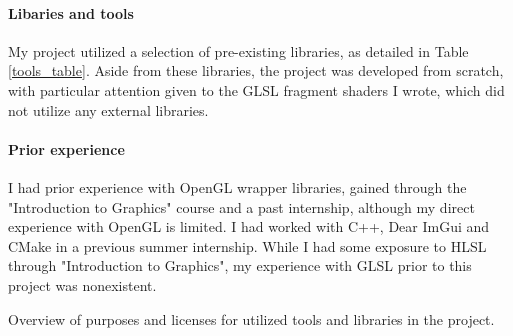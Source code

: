 \paragraph{Libaries and tools}
My project utilized a selection of pre-existing libraries, as detailed in Table \ref{tools_table}. Aside from these libraries, the project was developed from scratch, with particular attention given to the GLSL fragment shaders I wrote, which did not utilize any external libraries.

\paragraph{Prior experience}
I had prior experience with OpenGL wrapper libraries, gained through the "Introduction to Graphics" course and a past internship, although my direct experience with OpenGL is limited. I had worked with C++, Dear ImGui and CMake in a previous summer internship. While I had some exposure to HLSL through "Introduction to Graphics", my experience with GLSL prior to this project was nonexistent.

{Overview of purposes and licenses for utilized tools and libraries in the project.}
